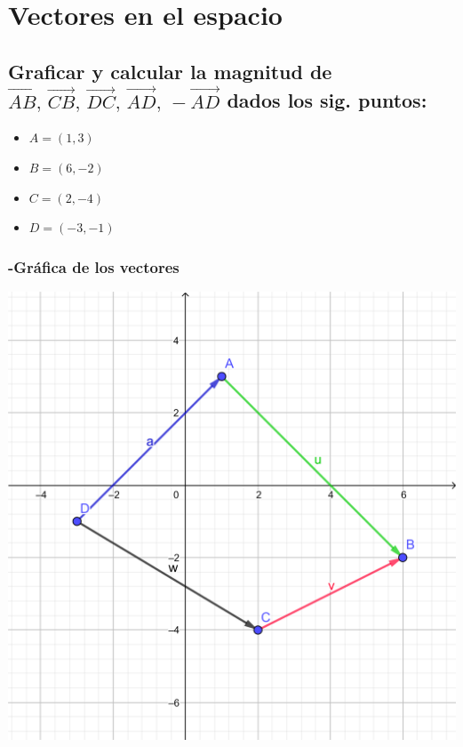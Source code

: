 \documentclass[letterpaper, 12pt]{article}
\begin{document}
\setcounter{page}{1}
\thispagestyle{fancy}
\section{Vectores en el espacio}
\subsection*{Graficar y calcular la magnitud de \(\vec{AB},\,\vec{CB},\,\vec{DC},\,\vec{AD},\,-\vec{AD}\) dados los sig. puntos:}
\begin{itemize}
    \item \(A=(1,3)\)
    \item \(B=(6,-2)\)
    \item \(C=(2,-4)\)
    \item \(D=(-3,-1)\)
\end{itemize}

\subsubsection*{-Gráfica de los vectores}    
\centering
\includegraphics[width=15cm]{graficasT1U1.png}
\justify
\end{document}

